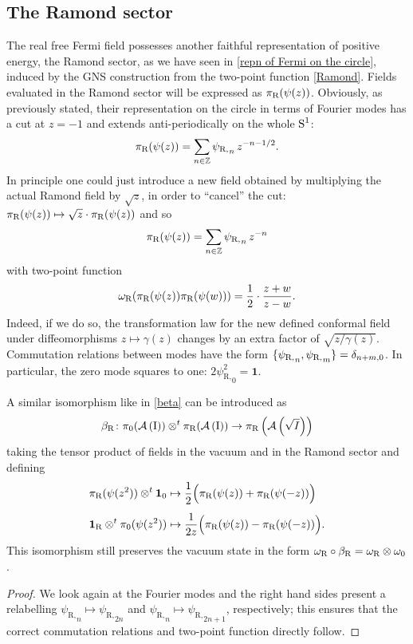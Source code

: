 \subsection{The Ramond sector}
\label{The Ramond sector}
The real free Fermi field possesses another faithful 
representation of positive energy, the Ramond 
sector, as we have seen in \ref{repn of Fermi on the circle}, 
induced by the \ac{GNS} construction from the 
two-point function \eqref{Ramond}. Fields evaluated
in the Ramond sector will be expressed as 
$\pi_{\textrm{R}}(\psi(z))$. Obviously, as previously stated, their 
representation on the circle in terms of Fourier modes
has a cut at $z=-1$ and extends anti-periodically on the 
whole $\textrm{S}^1$:
\[
\pi_{\textrm{R}}(\psi(z))=\sum_{n\in\mathbb{Z}}{\psi_{\textrm{R},}}_n \,z^{-n-1/2}.
\]
In principle one could just introduce a new field obtained 
by multiplying the actual Ramond field by $\sqrt{z}$, 
in order to ``cancel'' the cut: $\pi_{\textrm{R}}(\psi(z))\mapsto 
\sqrt{z}\cdot\pi_{\textrm{R}}(\psi(z))$ and so 
\[
\pi_{\textrm{R}}(\psi(z))=\sum_{n\in\mathbb{Z}}{\psi_{\textrm{R},}}_n \,z^{-n}
\]
with two-point function
\[
\omega_{\textrm{R}}(\pi_{\textrm{R}}(\psi(z))\pi_{\textrm{R}}(\psi(w)))=
\frac{1}{2}\cdot\frac{z+w}{z-w}.
\]
Indeed, if we do so, the transformation law for the new 
defined conformal field under diffeomorphisms 
$z\mapsto \gamma(z)$ changes by an extra factor of $\sqrt{z/\gamma(z)}$.
Commutation relations between modes have the form 
$\{{\psi_{\textrm{R},}}_n,{\psi_{\textrm{R},}}_m\}
=\delta_{n+m,0}$. In particular, the zero mode squares
to one: $2{\psi^2_{\textrm{R},}}_0=\bm{1}$.

\bigskip 
\begin{proposition}
A similar isomorphism like in \eqref{beta} can be 
introduced as 
\begin{equation}
\label{beta_ramond}
\beta_{\textrm{R}}\colon\pi_0(\mathcal{A}\left(\textrm{I}\right))\otimes^t 
\pi_{\textrm{R}}(\mathcal{A}\left(\textrm{I}\right))\to
\pi_{\textrm{R}}\left(\mathcal{A}\left(\sqrt{I}\right)\right)
\end{equation}
taking the tensor product of fields in the vacuum and in 
the Ramond sector and defining
\begin{align}
\pi_{\textrm{R}}(\psi(z^2))\otimes^t\bm{1}_0&\mapsto\frac{1}{2}
\Big(\pi_{\textrm{R}}(\psi(z))+\pi_{\textrm{R}}(\psi(-z))\Big)\\[1ex]
\bm{1}_{\textrm{R}}\otimes^t\pi_0(\psi(z^2))&\mapsto\frac{1}{2z}
\Big(\pi_{\textrm{R}}(\psi(z))-\pi_{\textrm{R}}(\psi(-z))\Big).
\end{align}
This isomorphism still preserves the vacuum state in the 
form $\omega_{\textrm{R}}\circ\beta_{\textrm{R}}=
\omega_{\textrm{R}}\otimes\omega_0$.
\end{proposition}
\begin{proof}
We look again at the Fourier modes and the right hand 
sides present a relabelling ${\psi_{\textrm{R},}}_n\mapsto 
{\psi_{\textrm{R},}}_{2n}$ and ${\psi_{\textrm{R},}}_n\mapsto 
{\psi_{\textrm{R},}}_{2n+1}$, respectively;
this ensures that the correct commutation relations 
and two-point function directly follow.\qedhere
\end{proof}











